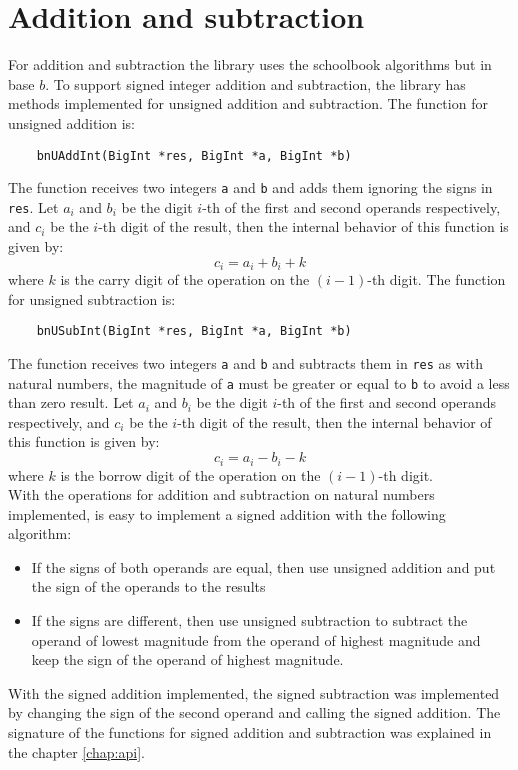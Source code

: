 \documentclass{book}
\begin{document}
\section{Addition and subtraction}
\label{sect:add}
For addition and subtraction the library uses the schoolbook algorithms but in base $b$. To support signed integer addition and subtraction, the library has methods implemented for unsigned addition and subtraction. The function for unsigned addition is:
    \begin{verbatim}
    bnUAddInt(BigInt *res, BigInt *a, BigInt *b)
    \end{verbatim}
The function receives two integers \verb+a+ and \verb+b+ and adds them ignoring the signs in \verb+res+. Let $a_i$ and $b_i$ be the digit $i$-th of the first and second operands respectively, and $c_i$ be the $i$-th digit of the result, then the internal behavior of this function is given by:
\[c_i = a_i + b_i + k \]
where $k$ is the carry digit of the operation on the $(i-1)$-th digit. The function for unsigned subtraction is:
    \begin{verbatim}
    bnUSubInt(BigInt *res, BigInt *a, BigInt *b)
    \end{verbatim}
The function receives two integers \verb+a+ and \verb+b+ and subtracts them in \verb+res+ as with natural numbers, the magnitude of \verb+a+ must be greater or equal to \verb+b+ to avoid a less than zero result. Let $a_i$ and $b_i$ be the digit $i$-th of the first and second operands respectively, and $c_i$ be the $i$-th digit of the result, then the internal behavior of this function is given by:
\[c_i = a_i - b_i - k \]
where $k$ is the borrow digit of the operation on the $(i-1)$-th digit. \\

With the operations for addition and subtraction on natural numbers implemented, is easy to implement a signed addition with the following algorithm:
\begin{itemize}
\item If the signs of both operands are equal, then use unsigned addition and put the sign of the operands to the results
\item If the signs are different, then use unsigned subtraction to subtract the operand of lowest magnitude from the operand of highest magnitude and keep the sign of the operand of highest magnitude.
\end{itemize}

With the signed addition implemented, the signed subtraction was implemented by changing the sign of the second operand and calling the signed addition. The signature of the functions for signed addition and subtraction was explained in the chapter \ref{chap:api}.
\end{document}
